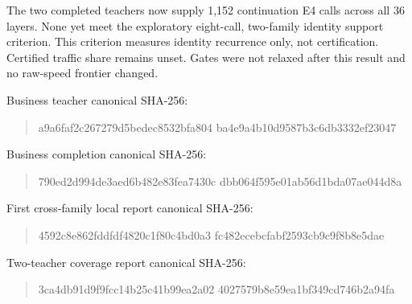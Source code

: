 The two completed teachers now supply 1,152 continuation E4 calls across all
36 layers. None yet meet the exploratory eight-call, two-family identity
support criterion. This criterion measures identity recurrence only, not
certification. Certified traffic share remains unset. Gates were not relaxed
after this result and no raw-speed frontier changed.

Business teacher canonical SHA-256:
\begin{quote}\ttfamily\small
a9a6faf2c267279d5bedec8532bfa804\allowbreak
ba4e9a4b10d9587b3c6db3332ef23047
\end{quote}
Business completion canonical SHA-256:
\begin{quote}\ttfamily\small
790ed2d994de3aed6b482e83fea7430c\allowbreak
dbb064f595e01ab56d1bda07ae044d8a
\end{quote}
First cross-family local report canonical SHA-256:
\begin{quote}\ttfamily\small
4592c8e862fddfdf4820c1f80c4bd0a3\allowbreak
fc482ecebcfabf2593cb9c9f8b8e5dae
\end{quote}
Two-teacher coverage report canonical SHA-256:
\begin{quote}\ttfamily\small
3ca4db91d9f9fcc14b25c41b99ea2a02\allowbreak
4027579b8e59ea1bf349cd746b2a94fa
\end{quote}
